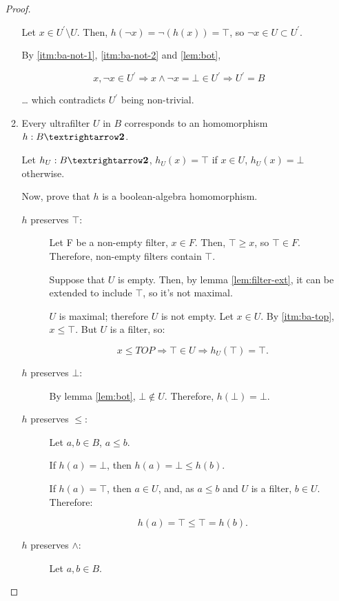 \documentclass[notitlepage,a4paper]{article}
\begin{document}
\begin{enumerate}
\begin{proof}
\begin{enumerate}
      Let $x ∈ U^\prime \setminus U$. Then, $h(¬x) = ¬(h(x)) = ⊤$, so $¬x ∈ U \subset U^\prime$.

      By \ref{itm:ba-not-1}, \ref{itm:ba-not-2} and \ref{lem:bot},
      
      $$x, ¬x ∈ U^\prime ⇒ x ∧ ¬x = ⊥ ∈ U^\prime ⇒ U^\prime = B$$

      … which contradicts $U^\prime$ being non-trivial.

   \item Every ultrafilter $U$ in $B$ corresponds to an homomorphism $h : B → \text{\bf 2}$.

     
     
     Let $h_U : B → \text{\bf 2}$, $h_U(x) = ⊤$ if $x ∈ U$, $h_U(x) = ⊥$ otherwise.

     Now, prove that $h$ is a boolean-algebra homomorphism.

     \begin{description}
       \item[$h$ preserves $⊤$:]

         Let F be a non-empty filter, $x ∈ F$. Then, $⊤ ≥ x$, so
         $⊤ ∈ F$. Therefore, non-empty filters contain $⊤$.

         Suppose that $U$ is empty. Then, by lemma \ref{lem:filter-ext},
         it can be extended to include $⊤$, so it's not maximal.
         
         $U$ is maximal; therefore $U$ is not empty. Let $x ∈ U$.
         By \ref{itm:ba-top}, $x ≤ ⊤$. But $U$ is a filter, so:
         
         $$x ≤ TOP ⇒ ⊤ ∈ U ⇒ h_U(⊤) = ⊤\text{.}$$

       \item[$h$ preserves $⊥$:]

         By lemma \ref{lem:bot}, $⊥ \not \in U$. Therefore, $h(⊥) = ⊥$.

       \item[$h$ preserves $≤$:]

         Let $a, b ∈ B$, $a ≤ b$.

         If $h(a) = ⊥$, then $h(a) = ⊥ ≤ h(b)$.

         If $h(a) = ⊤$, then $a ∈ U$, and, as $a ≤ b$ and $U$ is a
         filter, $b ∈ U$. Therefore:

         $$h(a) = ⊤ ≤ ⊤ = h(b)\text{.}$$

       \item[$h$ preserves $∧$:]

         Let $a, b ∈ B$.


\end{description}
\end{enumerate}
\end{proof}
\end{enumerate}
\end{document}
